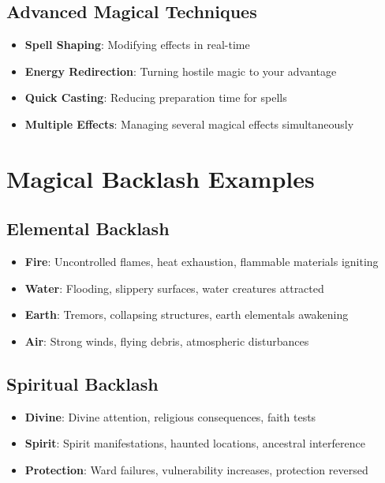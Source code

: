 \begin{multicols}{2}
\subsection*{Advanced Magical Techniques}
\begin{itemize}
\item \textbf{Spell Shaping}: Modifying effects in real-time
\item \textbf{Energy Redirection}: Turning hostile magic to your advantage
\item \textbf{Quick Casting}: Reducing preparation time for spells
\item \textbf{Multiple Effects}: Managing several magical effects simultaneously
\end{itemize}

\section{Magical Backlash Examples} 

\subsection*{Elemental Backlash}
\begin{itemize}
\item \textbf{Fire}: Uncontrolled flames, heat exhaustion, flammable materials igniting
\item \textbf{Water}: Flooding, slippery surfaces, water creatures attracted
\item \textbf{Earth}: Tremors, collapsing structures, earth elementals awakening
\item \textbf{Air}: Strong winds, flying debris, atmospheric disturbances
\end{itemize}

\subsection*{Spiritual Backlash}
\begin{itemize}
\item \textbf{Divine}: Divine attention, religious consequences, faith tests
\item \textbf{Spirit}: Spirit manifestations, haunted locations, ancestral interference
\item \textbf{Protection}: Ward failures, vulnerability increases, protection reversed
\end{itemize}


\end{multicols}

